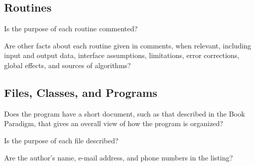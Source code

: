 \begin{multicols}{2}
\subsection*{Routines}
\begin{todolist}
  \item Is the purpose of each routine commented?
  \item Are other facts about each routine given in comments, when relevant, including input and output data, interface assumptions, limitations, error corrections, global effects, and sources of algorithms?
\end{todolist}

\subsection*{Files, Classes, and Programs}
\begin{todolist}
  \item Does the program have a short document, such as that described in the Book Paradigm, that gives an overall view of how the program is organized?
  \item Is the purpose of each file described?
  \item Are the author's name, e-mail address, and phone numbers in the listing?
\end{todolist}

\end{multicols}
